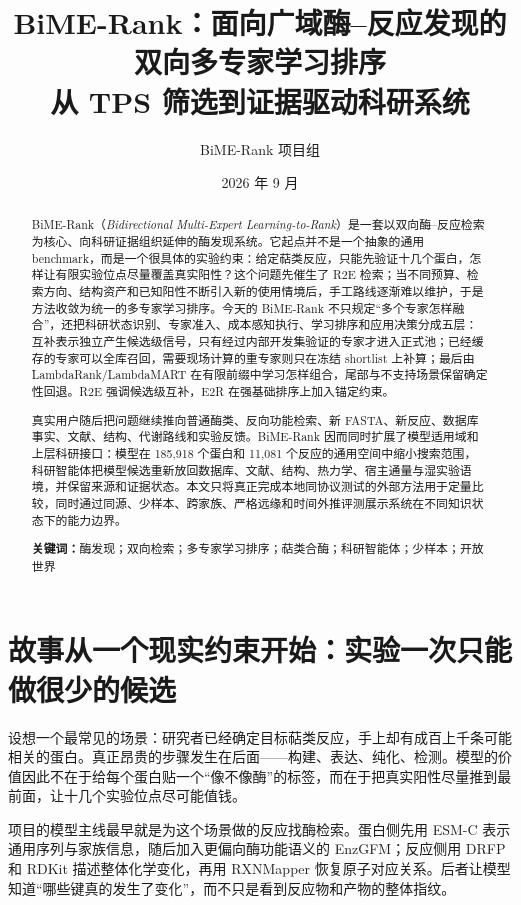 \documentclass[11pt,a4paper]{ctexart}
\title{\vspace{-1.5em}\textbf{BiME-Rank：面向广域酶--反应发现的双向多专家学习排序}\\[0.45em]
\large 从 TPS 筛选到证据驱动科研系统}
\author{BiME-Rank 项目组}
\date{2026 年 9 月}
\begin{document}
\maketitle

\begin{abstract}
BiME-Rank（\textit{Bidirectional Multi-Expert Learning-to-Rank}）是一套以双向酶--反应检索为核心、向科研证据组织延伸的酶发现系统。它起点并不是一个抽象的通用 benchmark，而是一个很具体的实验约束：给定萜类反应，只能先验证十几个蛋白，怎样让有限实验位点尽量覆盖真实阳性？这个问题先催生了 R2E 检索；当不同预算、检索方向、结构资产和已知阳性不断引入新的使用情境后，手工路线逐渐难以维护，于是方法收敛为统一的多专家学习排序。今天的 BiME-Rank 不只规定“多个专家怎样融合”，还把科研状态识别、专家准入、成本感知执行、学习排序和应用决策分成五层：互补表示独立产生候选级信号，只有经过内部开发集验证的专家才进入正式池；已经缓存的专家可以全库召回，需要现场计算的重专家则只在冻结 shortlist 上补算；最后由 LambdaRank/LambdaMART 在有限前缀中学习怎样组合，尾部与不支持场景保留确定性回退。R2E 强调候选级互补，E2R 在强基础排序上加入锚定约束。

真实用户随后把问题继续推向普通酶类、反向功能检索、新 FASTA、新反应、数据库事实、文献、结构、代谢路线和实验反馈。BiME-Rank 因而同时扩展了模型适用域和上层科研接口：模型在 185,918 个蛋白和 11,081 个反应的通用空间中缩小搜索范围，科研智能体把模型候选重新放回数据库、文献、结构、热力学、宿主通量与湿实验语境，并保留来源和证据状态。本文只将真正完成本地同协议测试的外部方法用于定量比较，同时通过同源、少样本、跨家族、严格远缘和时间外推评测展示系统在不同知识状态下的能力边界。

\textbf{关键词：}酶发现；双向检索；多专家学习排序；萜类合酶；科研智能体；少样本；开放世界
\end{abstract}

\tableofcontents
\newpage

\section{故事从一个现实约束开始：实验一次只能做很少的候选}

设想一个最常见的场景：研究者已经确定目标萜类反应，手上却有成百上千条可能相关的蛋白。真正昂贵的步骤发生在后面——构建、表达、纯化、检测。模型的价值因此不在于给每个蛋白贴一个“像不像酶”的标签，而在于把真实阳性尽量推到最前面，让十几个实验位点尽可能值钱。

项目的模型主线最早就是为这个场景做的反应找酶检索。蛋白侧先用 ESM-C 表示通用序列与家族信息\cite{esmc2024}，随后加入更偏向酶功能语义的 EnzGFM\cite{enzgfm2026}；反应侧用 DRFP 和 RDKit 描述整体化学变化\cite{drfp2022,rdkit}，再用 RXNMapper 恢复原子对应关系\cite{rxnmapper2021}。后者让模型知道“哪些键真的发生了变化”，而不只是看到反应物和产物的整体指纹。
\end{document}
